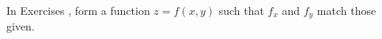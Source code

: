 {\noindent In Exercises}
{, form a function $z=f(x,y)$ such that $f_x$ and $f_y$ match those given.}
